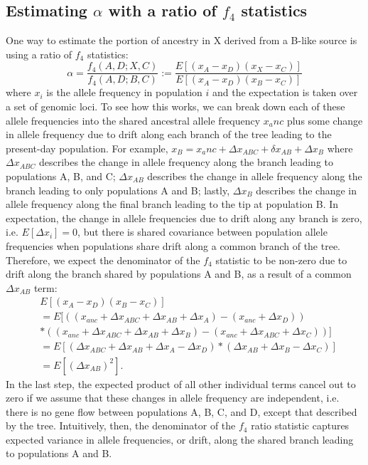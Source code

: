 \documentclass[12pt]{report}
\begin{document}
\subsection{Estimating $\alpha$ with a ratio of $f_4$ statistics}
One way to estimate the portion of ancestry in X derived from a B-like source is using a ratio of $f_4$ statistics:
\begin{equation}
\alpha = \frac{f_4(A,D;X,C)}{f_4(A,D;B,C)} := \frac{E[(x_A - x_D)(x_X - x_C)]}{E[(x_A - x_D)(x_B - x_C)]}
\end{equation}
where $x_i$ is the allele frequency in population $i$ and the expectation is taken over a set of genomic loci. To see how this works, we can break down each of these allele frequencies into the shared ancestral allele frequency $x_anc$ plus some change in allele frequency due to drift along each branch of the tree leading to the present-day population. For example, $x_B = x_anc + \Delta{x_{ABC}} + \delta{x_{AB}} + \Delta{x_B}$ where $\Delta{x_{ABC}}$ describes the change in allele frequency along the branch leading to populations A, B, and C; $\Delta{x_{AB}}$ describes the change in allele frequency along the branch leading to only populations A and B; lastly, $\Delta{x_B}$ describes the change in allele frequency along the final branch leading to the tip at population B. In expectation, the change in allele frequencies due to drift along any branch is zero, i.e. $E[\Delta{x_i}]=0$, but there is shared covariance between population allele frequencies when populations share drift along a common branch of the tree. Therefore, we expect the denominator of the $f_4$ statistic to be non-zero due to drift along the branch shared by populations A and B, as a result of a common $\Delta{x_{AB}}$ term:
\begin{align*}
&E[(x_A - x_D)(x_B - x_C)] \\
&= E[((x_{anc} + \Delta{x_{ABC}} + \Delta{x_{AB}} + \Delta{x_{A}}) - (x_{anc} + \Delta{x_{D}})) \\
&*((x_{anc} + \Delta{x_{ABC}} + \Delta{x_{AB}} + \Delta{x_B}) - (x_{anc} + \Delta{x_{ABC}} + \Delta{x_C}))] \\
&=E[(\Delta{x_{ABC}} + \Delta{x_{AB}} + \Delta{x_{A}} - \Delta{x_{D}})*(\Delta{x_{AB}} + \Delta{x_B} - \Delta{x_C})]\\
&=E[(\Delta{x_{AB}})^2].
\end{align*}
In the last step, the expected product of all other individual terms cancel out to zero if we assume that these changes in allele frequency are independent, i.e. there is no gene flow between populations A, B, C, and D, except that described by the tree. Intuitively, then, the denominator of the $f_4$ ratio statistic captures expected variance in allele frequencies, or drift, along the shared branch leading to populations A and B.\par
\end{document}
